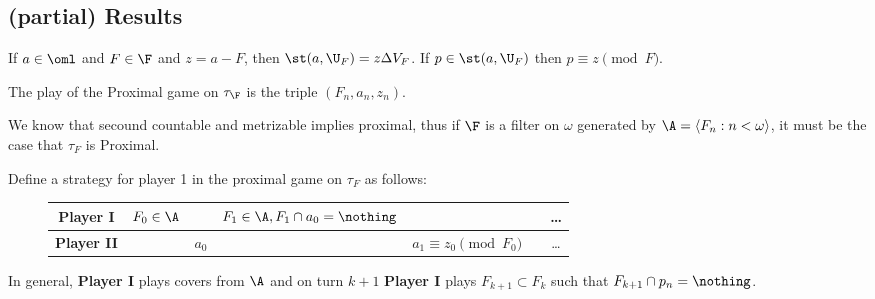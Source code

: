 \documentclass{article}
\begin{document}

\newpage
\subsection{(partial) Results}

\begin{observation}
    If \(a \in \oml\) and \( F \in \F\) and \(z = a- F\), then \(\st(a, \U_F) = z\Delta V_F\). If \(p \in \st(a, \U_F)\) then \(p \equiv z \pmod F\).
\end{observation}
\begin{observation}
    The play of the Proximal game on \(\tau_{\F}\) is the triple \((F_n, a_n, z_n)\).
\end{observation}
We know that secound countable and metrizable implies proximal, thus if \(\F\) is a filter on \(\omega\) generated by \(\A = \langle F_n : n < \omega \rangle\), it must be the case that \(\tau_F\) is Proximal. 

Define a strategy for player 1 in the proximal game on \(\tau_F\) as follows:

\begin{figure}[h]
    \centering
    \begin{tabular}{|c|c|c|c|c|c|c|}
        \hline
        \textbf{Player I}  & \(F_0 \in \A\) & & \(F_1 \in \A, F_1\cap a_0 = \nothing\) & & & \dots \\
        \hline
        \textbf{Player II} & & \(a_0\) & & \(a_1 \equiv z_0 \pmod {F_0} \) & & \dots \\
        \hline
    \end{tabular}
\end{figure}
In general, \textbf{Player I} plays covers from \(\A\) and on turn \(k+1\) \textbf{Player I} plays \(F_{k + 1} \subset F_k\) such that \(F_{k + 1}\cap p_n = \nothing\).
\end{document}
